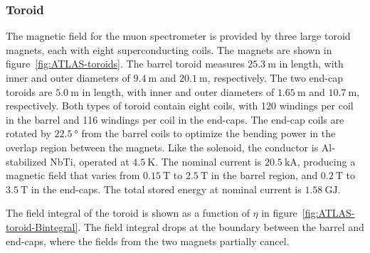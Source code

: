 \subsubsection{Toroid}\label{sec:ATLAS-magnets-toroid}

The magnetic field for the muon spectrometer is provided by three large toroid magnets, each with eight superconducting coils. The magnets are shown in figure~\ref{fig:ATLAS-toroids}. The barrel toroid measures $\SI{25.3}{\meter}$ in length, with inner and outer diameters of $\SI{9.4}{\meter}$ and $\SI{20.1}{\meter}$, respectively. The two end-cap toroids are $\SI{5.0}{\meter}$ in length, with inner and outer diameters of $\SI{1.65}{\meter}$ and $\SI{10.7}{\meter}$, respectively. Both types of toroid contain eight coils, with 120 windings per coil in the barrel and 116 windings per coil in the end-caps. The end-cap coils are rotated by $\SI{22.5}{\degree}$ from the barrel coils to optimize the bending power in the overlap region between the magnets. Like the solenoid, the conductor is Al-stabilized NbTi, operated at $\SI{4.5}{\kelvin}$. The nominal current is $\SI{20.5}{\kilo\ampere}$, producing a magnetic field that varies from $\SI{0.15}{\tesla}$ to $\SI{2.5}{\tesla}$ in the barrel region, and $\SI{0.2}{\tesla}$ to $\SI{3.5}{\tesla}$ in the end-caps. The total stored energy at nominal current is $\SI{1.58}{\giga\joule}$. 

The field integral of the toroid is shown as a function of $\eta$ in figure~\ref{fig:ATLAS-toroid-Bintegral}. The field integral drops at the boundary between the barrel and end-caps, where the fields from the two magnets partially cancel. 

